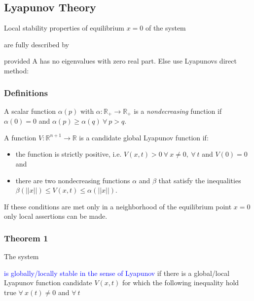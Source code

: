 \documentclass[10pt,a4paper]{scrartcl}
\begin{document}
\begin{multicols*}{3}
\subsection{Lyapunov Theory}

Local stability properties of equilibrium $x=0$ of the system


are fully described by


provided A has no eigenvalues with zero real part. Else use Lyapunovs direct method:

\subsubsection{Definitions}

A scalar function $\alpha(p)$ with $\alpha:\mathbb{R}_+\rightarrow\mathbb{R}_+$ is a \emph{nondecreasing} function if $\alpha(0)=0$ and $\alpha(p)\geq\alpha(q)\ \forall\ p>q$.

A function $V:\mathbb{R}^{n+1}\rightarrow \mathbb{R}$ is a candidate global Lyapunov function if:

\begin{itemize}
\ncompaq
\item the function is strictly positive, i.e. $V(x,t)>0\ \forall\ x\neq 0,\ \forall\ t$ and $V(0) = 0$ and
\item there are two nondecreasing functions $\alpha$ and $\beta$ that satisfy the inequalities $\beta(||x||)\leq V(x,t)\leq\alpha(||x||)$.
\end{itemize}

If these conditions are met only in a neighborhood of the equilibrium point $x=0$ only local assertions can be made.

\subsubsection{Theorem 1}
The system


\textcolor{blue}{is globally/locally stable in the sense of Lyapunov} if there is a global/local Lyapunov function candidate $V(x,t)$ for which the following inequality hold true $\forall\ x(t)\neq 0$ and $\forall\ t$



\end{multicols*}
\end{document}
